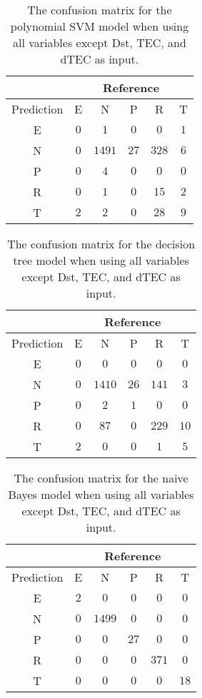 \begin{table}[!ht]
	\centering
	\begin{tabular}{|c|c|c|c|c|c|}
		\hline
		 & \multicolumn{5}{|c|}{Reference} \\ \hline
		 Prediction & E & N & P & R & T \\ \hline
		 E & $0$ & $1$ & $0$ & $0$ & $1$ \\ \hline
		 N & $0$ & $1491$ & $27$ & $328$ & $6$ \\ \hline
		 P & $0$ & $4$ & $0$ & $0$ & $0$ \\ \hline
		 R & $0$ & $1$ & $0$ & $15$ & $2$ \\ \hline
		 T & $2$ & $2$ & $0$ & $28$ & $9$ \\ \hline
	\end{tabular}
	\caption{The confusion matrix for the polynomial SVM model when using all variables except Dst, TEC, and dTEC as input.}
	\label{tab:cm:noTEC:svmPoly}
\end{table}

\begin{table}[!ht]
	\centering
	\begin{tabular}{|c|c|c|c|c|c|}
		\hline
		 & \multicolumn{5}{|c|}{Reference} \\ \hline
		 Prediction & E & N & P & R & T \\ \hline
		 E & $0$ & $0$ & $0$ & $0$ & $0$ \\ \hline
		 N & $0$ & $1410$ & $26$ & $141$ & $3$ \\ \hline
		 P & $0$ & $2$ & $1$ & $0$ & $0$ \\ \hline
		 R & $0$ & $87$ & $0$ & $229$ & $10$ \\ \hline
		 T & $2$ & $0$ & $0$ & $1$ & $5$ \\ \hline
	\end{tabular}
	\caption{The confusion matrix for the decision tree model when using all variables except Dst, TEC, and dTEC as input.}
	\label{tab:cm:noTEC:C5.0}
\end{table}

\begin{table}[!ht]
	\centering
	\begin{tabular}{|c|c|c|c|c|c|}
		\hline
		 & \multicolumn{5}{|c|}{Reference} \\ \hline
		 Prediction & E & N & P & R & T \\ \hline
		 E & $2$ & $0$ & $0$ & $0$ & $0$ \\ \hline
		 N & $0$ & $1499$ & $0$ & $0$ & $0$ \\ \hline
		 P & $0$ & $0$ & $27$ & $0$ & $0$ \\ \hline
		 R & $0$ & $0$ & $0$ & $371$ & $0$ \\ \hline
		 T & $0$ & $0$ & $0$ & $0$ & $18$ \\ \hline
	\end{tabular}
	\caption{The confusion matrix for the naive Bayes model when using all variables except Dst, TEC, and dTEC as input.}
	\label{tab:cm:noTEC:nb}
\end{table}

